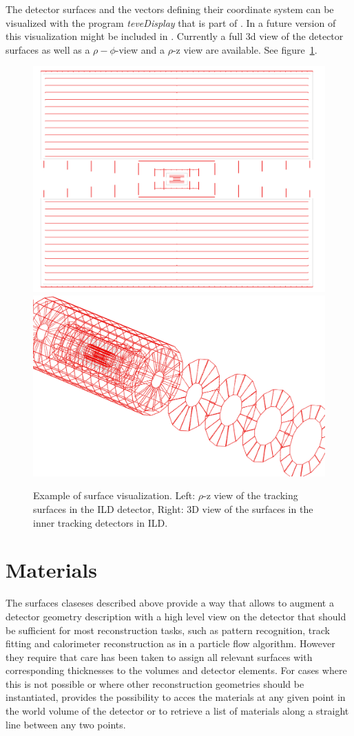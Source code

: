 \documentclass[10pt,a4paper]{article}
\begin{document}
The detector surfaces and the vectors defining their coordinate system can be
visualized with the program {\em teveDisplay} that is part of \DDH. In a future
version of \DDH this visualization might be included in \DDE.
Currently a full 3d view of the detector surfaces as well as a $\rho-\phi$-view
and a $\rho$-z view are available. See figure~\ref{fig:ddrec_surfaces_visualization}.

\begin{figure}[h]
  \begin{center}
    \includegraphics[width=0.48\hsize]{DDRec_rhoz_surfaces.png} \includegraphics[width=0.48\hsize]{DDRec_inner_tracking_surfaces.png}
    \caption{Example of surface visualization. Left: $\rho$-z view of the tracking surfaces in the ILD detector, Right: 3D view of the 
    surfaces in the inner tracking detectors in ILD.}
    \label{fig:ddrec_surfaces_visualization}
  \end{center}
\end{figure}
 


\section{Materials}
\label{sec:ddrec-manual-materials}
The surfaces claseses described above provide a way that allows to
augment a detector geometry description with a high level view on the detector
that should be sufficient for most reconstruction tasks, such as pattern
recognition, track fitting and calorimeter reconstruction as in a particle 
flow algorithm. However they require that care has been taken to assign all
relevant surfaces with corresponding thicknesses to the volumes and detector
elements. For cases where this is not possible or where other reconstruction
geometries should be instantiated, \DDR provides the possibility to acces
the materials at any given point in the world volume of the detector or 
to retrieve a list of materials along a straight line between any two points.
\end{document}
